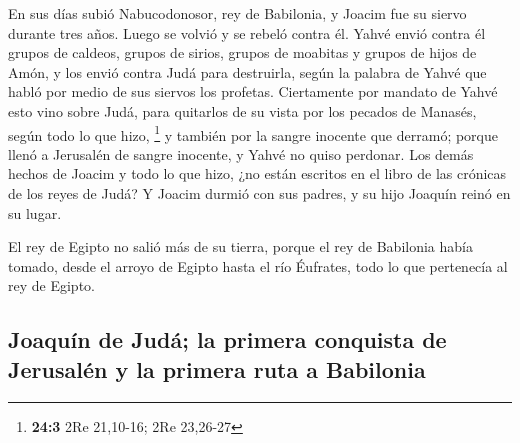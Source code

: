\begin{paracol}{2}
 En sus días subió Nabucodonosor, rey de Babilonia, y
Joacim fue su siervo durante tres años. Luego se volvió y se rebeló
contra él.  Yahvé envió contra él grupos de caldeos,
grupos de sirios, grupos de moabitas y grupos de hijos de Amón, y los
envió contra Judá para destruirla, según la palabra de Yahvé que habló
por medio de sus siervos los profetas.  Ciertamente por
mandato de Yahvé esto vino sobre Judá, para quitarlos de su vista por
los pecados de Manasés, según todo lo que hizo, \footnote{\textbf{24:3}
  2Re 21,10-16; 2Re 23,26-27}  y también por la sangre
inocente que derramó; porque llenó a Jerusalén de sangre inocente, y
Yahvé no quiso perdonar.  Los demás hechos de Joacim y
todo lo que hizo, ¿no están escritos en el libro de las crónicas de los
reyes de Judá?  Y Joacim durmió con sus padres, y su hijo
Joaquín reinó en su lugar.

 El rey de Egipto no salió más de su tierra, porque el rey
de Babilonia había tomado, desde el arroyo de Egipto hasta el río
Éufrates, todo lo que pertenecía al rey de Egipto.

\hypertarget{joaquuxedn-de-juduxe1-la-primera-conquista-de-jerusaluxe9n-y-la-primera-ruta-a-babilonia}{%
\subsection{Joaquín de Judá; la primera conquista de Jerusalén y la
primera ruta a
Babilonia}\label{joaquuxedn-de-juduxe1-la-primera-conquista-de-jerusaluxe9n-y-la-primera-ruta-a-babilonia}}


\end{paracol}

